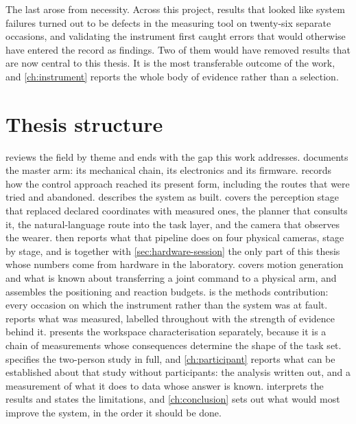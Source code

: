The last arose from necessity. Across this project, results that looked like
system failures turned out to be defects in the measuring tool on
twenty-six separate occasions, and validating the instrument first caught
errors that would otherwise have entered the record as findings. Two of them
would have removed results that are now central to this thesis. It is the most
transferable outcome of the work, and \cref{ch:instrument} reports the whole
body of evidence rather than a selection.

\section{Thesis structure}

 reviews the field by theme and ends with the gap this
work addresses.  documents the master arm: its mechanical
chain, its electronics and its firmware.  records how the
control approach reached its present form, including the routes that were
tried and abandoned.  describes the system as built.
 covers the perception stage that replaced declared
coordinates with measured ones, the planner that consults it, the
natural-language route into the task layer, and the camera that observes the
wearer.  then reports what that pipeline does on four
physical cameras, stage by stage, and is together with
\cref{sec:hardware-session} the only part of this thesis whose numbers come
from hardware in the laboratory.  covers motion generation and what is known about
transferring a joint command to a physical arm, and assembles the positioning
and reaction budgets.  is the methods contribution: every
occasion on which the instrument rather than the system was at fault.
 reports what was measured, labelled throughout with the
strength of evidence behind it.  presents the workspace
characterisation separately, because it is a chain of measurements whose
consequences determine the shape of the task set.  specifies
the two-person study in full, and \cref{ch:participant} reports what can be
established about that study without participants: the analysis written out,
and a measurement of what it does to data whose answer is known.  interprets the results and states the
limitations, and \cref{ch:conclusion} sets out what would most improve the
system, in the order it should be done.
